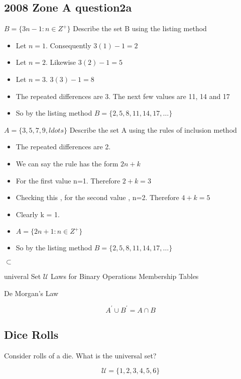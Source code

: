 
\subsection*{2008  Zone A question2a}
$B = \{3n-1 :n \in Z^{+} \}$
Describe the set B using the listing method

\begin{itemize}
\item Let $n=1$. Consequently $3(1)-1 =2$
\item Let $n=2$. Likewise $3(2)-1 =5$
\item Let $n=3$. $3(3)-1 = 8 $
\item The repeated differences are 3. The next few values are 11, 14 and 17
\item So by the listing method $B= \{2,5,8,11,14,17,\ldots\}$
\end{itemize}

$A = \{3,5,7,9,ldots \}$
Describe the set A using the rules of inclusion method

\begin{itemize}
\item The repeated differences are 2.
\item We can say the rule has the form $2n+k$
\item For the first value n=1. Therefore $2+k=3$
\item Checking this , for the second value , n=2. Therefore $4+k=5$
\item Clearly k = 1.
\item $A = \{2n+1 :n \in Z^{+} \}$
\item So by the listing method $B= \{2,5,8,11,14,17,\ldots\}$
\end{itemize}


$\subset$

univeral Set $\mathcal{U}$
Laws for Binary Operations
Membership Tables

De Morgan's Law


\[A^{\prime} \cup B^{\prime} = A \cap B\]



\subsection*{Dice Rolls}
Consider rolls of a die. What is the universal set?

\[ \mathcal{U} = \{1,2,3,4,5,6\} \]




